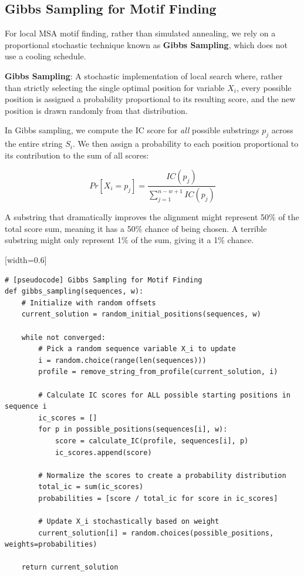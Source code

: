 \subsection{Gibbs Sampling for Motif Finding}
For local MSA motif finding, rather than simulated annealing, we rely on a proportional stochastic technique known as \textbf{Gibbs Sampling}, which does not use a cooling schedule.

\begin{important}
  \textbf{Gibbs Sampling}: A stochastic implementation of local search where, rather than strictly selecting the single optimal position for variable $X_i$, every possible position is assigned a probability proportional to its resulting score, and the new position is drawn randomly from that distribution.
\end{important}

In Gibbs sampling, we compute the IC score for \textit{all} possible substrings $p_j$ across the entire string $S_i$. We then assign a probability to each position proportional to its contribution to the sum of all scores:

\[ Pr[X_i = p_j] = \frac{IC(p_j)}{\sum_{j=1}^{n-w+1} IC(p_j)} \]

A substring that dramatically improves the alignment might represent 50\% of the total score sum, meaning it has a 50\% chance of being chosen. A terrible substring might only represent 1\% of the sum, giving it a 1\% chance.

[width=0.6\textwidth]

\begin{verbatim}
# [pseudocode] Gibbs Sampling for Motif Finding
def gibbs_sampling(sequences, w):
    # Initialize with random offsets
    current_solution = random_initial_positions(sequences, w)

    while not converged:
        # Pick a random sequence variable X_i to update
        i = random.choice(range(len(sequences)))
        profile = remove_string_from_profile(current_solution, i)

        # Calculate IC scores for ALL possible starting positions in sequence i
        ic_scores = []
        for p in possible_positions(sequences[i], w):
            score = calculate_IC(profile, sequences[i], p)
            ic_scores.append(score)

        # Normalize the scores to create a probability distribution
        total_ic = sum(ic_scores)
        probabilities = [score / total_ic for score in ic_scores]

        # Update X_i stochastically based on weight
        current_solution[i] = random.choices(possible_positions, weights=probabilities)

    return current_solution
\end{verbatim}

